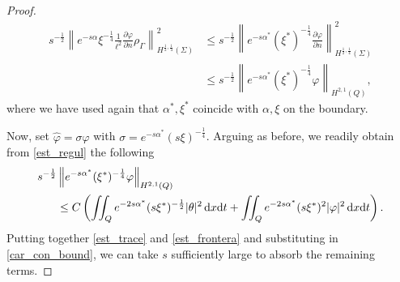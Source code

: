 \documentclass{aims}
\theoremstyle{definition}
\def\csbd{\rho_{\Gamma}}
\def\dx{\,\textnormal{d}x}
\def\dt{\textnormal{d}t}
\begin{document}
\begin{proof}
\begin{equation}\label{est_trace}
\begin{split}
s^{-\frac{1}{2}}\left\|e^{-s\alpha}\xi^{-\frac{1}{4}} \frac{1}{\ell^2} \frac{\partial \varphi}{\partial n}\csbd \right\|^2_{H^{\frac{1}{2},\frac{1}{4}}(\Sigma)} & \leq s^{-\frac{1}{2}}\left\|e^{-s\alpha^*}(\xi^*)^{-\frac{1}{4}} \frac{\partial \varphi}{\partial n} \right\|^2_{H^{\frac{1}{2},\frac{1}{4}}(\Sigma)} \\
&\leq s^{-\frac{1}{2}}\left\| e^{-s\alpha^*}(\xi^*)^{-\frac{1}{4}} \varphi \right\|_{H^{2,1}(Q)},
\end{split}
\end{equation}
%
where we have used again that $\alpha^*,\xi^*$ coincide with $\alpha,\xi$ on the boundary. 

Now, set $\widehat \varphi=\sigma \varphi$ with $\sigma=e^{-s\alpha^*}(s\xi)^{-\frac{1}{4}}$. Arguing as before, we readily obtain from \eqref{est_regul} the following 
%
\begin{equation}\label{est_frontera}
\begin{split}
s^{-\frac{1}{2}}&\left\| e^{-s\alpha^*}(\xi^*)^{-\frac{1}{4}} \varphi \right\|_{H^{2,1}(Q)}\\
&\leq C\left(\iint_{Q}e^{-2s\alpha^*}(s\xi^*)^{-\frac{1}{2}}|\theta|^2\dx\dt+\iint_{Q}e^{-2s\alpha^*}(s\xi^*)^2|\varphi|^2\dx\dt\right).
\end{split}
\end{equation}
%
Putting together \eqref{est_trace} and \eqref{est_frontera} and substituting in \eqref{car_con_bound}, we can take $s$ sufficiently large to absorb the remaining terms. 


\end{proof}
\end{document}
